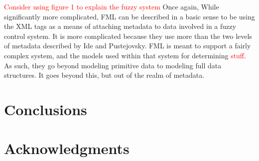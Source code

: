 \documentclass{sig-alternate}
\newcommand{\mycomment}[1]{\textcolor{red}{#1}}
\begin{document}
\mycomment{Consider using \cite{Acampora:2013} figure 1 to explain the fuzzy system}
Once again, 
While significantly more complicated, FML can be described in a basic sense to be using the XML tags as a means of attaching metadata to data involved in a fuzzy control system. It is more complicated because they use more than the two levels of metadata described by Ide and Pustejovsky. FML is meant to support a fairly complex system, and the models used within that system for determining \textcolor{red}{stuff}. As such, they go beyond modeling primitive data to modeling full data structures. It goes beyond this, but out of the realm of metadata. 

\section{Conclusions}


\section{Acknowledgments}




\end{document}
